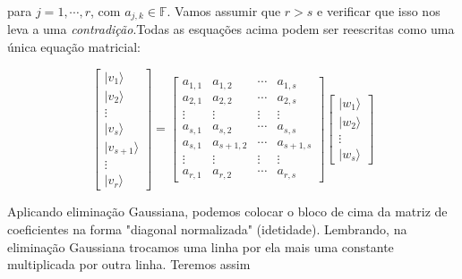 \documentclass[11pt]{article}
\begin{document}
para \(j=1,\cdots,r\), com \(a_{j,k}\in\mathbb{F}\). Vamos assumir que
\(r>s\) e verificar que isso nos leva a uma \emph{contradição}.Todas as
esquações acima podem ser reescritas como uma única equação matricial:

\begin{equation}
\begin{bmatrix} |v_{1}\rangle \\ |v_{2}\rangle \\ \vdots \\ |v_{s}\rangle \\ |v_{s+1}\rangle \\ \vdots \\ |v_{r}\rangle \end{bmatrix}
= \begin{bmatrix} a_{1,1} & a_{1,2} & \cdots & a_{1,s} \\  a_{2,1} & a_{2,2} & \cdots & a_{2,s} \\ \vdots & \vdots & \vdots & \vdots \\ a_{s,1} & a_{s,2} & \cdots & a_{s,s} \\ a_{s,1} & a_{s+1,2} & \cdots & a_{s+1,s} \\  \vdots & \vdots & \vdots & \vdots  \\ a_{r,1} & a_{r,2} & \cdots & a_{r,s} \end{bmatrix}\begin{bmatrix} |w_{1}\rangle \\ |w_{2}\rangle \\ \vdots \\ |w_{s}\rangle \end{bmatrix}
\end{equation}

Aplicando eliminação Gaussiana, podemos colocar o bloco de cima da
matriz de coeficientes na forma "diagonal normalizada" (idetidade).
Lembrando, na eliminação Gaussiana trocamos uma linha por ela mais uma
constante multiplicada por outra linha. Teremos assim
\end{document}
